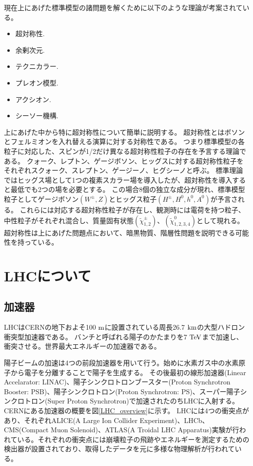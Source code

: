 現在上にあげた標準模型の諸問題を解くために以下のような理論が考案されている。
\begin{itemize}
  \item 超対称性.
  \item 余剰次元.
  \item テクニカラー.
  \item プレオン模型.
  \item アクシオン.
  \item シーソー機構.
\end{itemize}

上にあげた中から特に超対称性\cite{1-11}について簡単に説明する。
超対称性とはボソンとフェルミオンを入れ替える演算に対する対称性である。
つまり標準模型の各粒子に対応した、スピンが1/2だけ異なる超対称性粒子の存在を予言する理論である。
クォーク、レプトン、ゲージボソン、ヒッグスに対する超対称性粒子をそれぞれスクォーク、スレプトン、ゲージーノ、ヒグシーノと呼ぶ。
標準理論ではヒッグス場として1つの複素スカラー場を導入したが、超対称性を導入すると最低でも2つの場を必要とする。
この場合8個の独立な成分が現れ、標準模型粒子としてゲージボソン$(W^{\pm},Z)$とヒッグス粒子$(H^{\pm},H^0,h^0,A^0)$が予言される。
これらには対応する超対称性粒子が存在し、観測時には電荷を持つ粒子、中性粒子がそれぞれ混合し、質量固有状態$(\widetilde{\chi}^{\pm}_{1,2})$、$(\widetilde{\chi}^{0}_{1,2,3,4})$として現れる。
超対称性は上にあげた問題点において、暗黒物質、階層性問題を説明できる可能性を持っている。

\clearpage
\section{LHCについて}
\subsection{加速器}
LHCはCERNの地下およそ100 $\rm{m}$に設置されている周長26.7 $\rm{km}$の大型ハドロン衝突型加速器である。
バンチと呼ばれる陽子のかたまりを7 $\rm{TeV}$まで加速し、衝突させる。世界最大エネルギーの加速器である。

陽子ビームの加速は4つの前段加速器を用いて行う。始めに水素ガス中の水素原子から電子を分離することで陽子を生成する。
その後最初の線形加速器(Linear Accelarator: LINAC)、陽子シンクロトロンブースター(Proton Synchrotron Booster: PSB)、陽子シンクロトロン(Proton Synchrotron: PS)、スーパー陽子シンクロトロン(Super Proton Synchrotron)で加速されたのちLHCに入射する。CERNにある加速器の概要を図\ref{LHC_overview}に示す。
LHCには4つの衝突点があり、それぞれALICE(A Large Ion Collider Experiment)、LHCb、CMS(Compact Muon Solenoid)、ATLAS(A
Troidal LHC Apparatus)実験が行われている。それぞれの衝突点には崩壊粒子の飛跡やエネルギーを測定するための検出器が設置されており、取得したデータを元に多様な物理解析が行われている。

